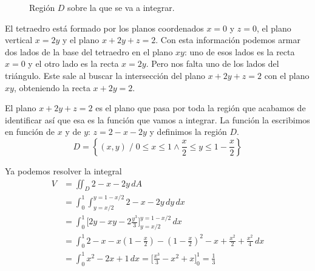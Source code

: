 \documentclass[12pt]{article}
\begin{document}
\begin{figure}[H]
\begin{minipage}{0.5\textwidth}
    \caption{Región $ D $ sobre la que se va a integrar.}
    \label{grf:integrales-dobles-ej4-2d}
  \end{minipage}
\end{figure}

El tetraedro está formado por los planos coordenados $ x=0 $ y $ z=0 $, el plano vertical $ x=2y $ y el plano $ x+2y+z=2 $. Con esta información podemos armar dos lados de la base del tetraedro en el plano $ xy $: uno de esos lados es la recta $ x=0 $ y el otro lado es la recta $ x=2y $. Pero nos falta uno de los lados del triángulo. Este sale al buscar la intersección del plano $ x+2y+z=2 $ con el plano $ xy $, obteniendo la recta $ x+2y=2 $. 

El plano $ x+2y+z=2 $ es el plano que pasa por toda la región que acabamos de identificar así que esa es la función que vamos a integrar. La función la escribimos en función de $ x $ y de $ y $: $ z=2-x-2y $ y definimos la región $ D $.
\[
  D=\left\{(x,y) \;/\; 0\leq x\leq 1 \land \frac{x}{2}\leq y\leq 1-\frac{x}{2}\right\}
\]

Ya podemos resolver la integral
\begin{align*}
  V &= \iint_{D} 2-x-2y \,dA\\
   &= \int_{0}^{1} \int_{y=x/2}^{y=1-x/2} 2-x-2y \,dy\,dx\\
    &= \int_{0}^{1} \Bigg[2y-xy-2\frac{y^3}{3}\Bigg]_{y=x/2}^{y=1-x/2} \,dx\\
     &= \int_{0}^{1} 2-x-x\left(1-\frac{x}{2}\right)-\left(1-\frac{x}{2}\right)^2-x+\frac{x^2}{2}+\frac{x^2}{4} \,dx\\
      &= \int_{0}^{1} x^2-2x+1 \,dx = \Bigg[\frac{x^3}{3}-x^2+x\Bigg]_{0}^{1}=\frac{1}{3}
\end{align*}
\end{document}
